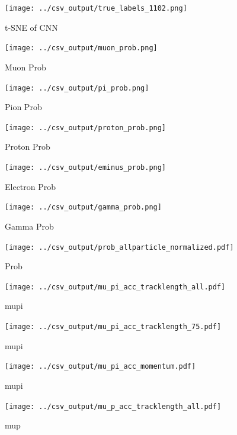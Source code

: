 \begin{figure}[htp]
\centering
\texttt{[image: ../csv\_output/true\_labels\_1102.png]}
\caption{t-SNE of CNN}
\label{fig:tsne}
\end{figure}

\begin{figure}[htp]
\centering
\texttt{[image: ../csv\_output/muon\_prob.png]}
\caption{Muon Prob}
\label{fig:muonprob}
\end{figure}

\begin{figure}[htp]
\centering
\texttt{[image: ../csv\_output/pi\_prob.png]}
\caption{Pion Prob}
\label{fig:piprob}
\end{figure}

\begin{figure}[htp]
\centering
\texttt{[image: ../csv\_output/proton\_prob.png]}
\caption{Proton Prob}
\label{fig:protonprob}
\end{figure}

\begin{figure}[htp]
\centering
\texttt{[image: ../csv\_output/eminus\_prob.png]}
\caption{Electron Prob}
\label{fig:eminusprob}
\end{figure}

\begin{figure}[htp]
\centering
\texttt{[image: ../csv\_output/gamma\_prob.png]}
\caption{Gamma Prob}
\label{fig:gammaprob}
\end{figure}

\begin{figure}[htp]
\centering
\texttt{[image: ../csv\_output/prob\_allparticle\_normalized.pdf]}
\caption{Prob}
\label{fig:prob}
\end{figure}

\begin{figure}[htp]
\centering
\texttt{[image: ../csv\_output/mu\_pi\_acc\_tracklength\_all.pdf]}
\caption{mupi}
\label{fig:mu_pi}
\end{figure}

\begin{figure}[htp]
\centering
\texttt{[image: ../csv\_output/mu\_pi\_acc\_tracklength\_75.pdf]}
\caption{mupi}
\label{fig:mu_pi}
\end{figure}

\begin{figure}[htp]
\centering
\texttt{[image: ../csv\_output/mu\_pi\_acc\_momentum.pdf]}
\caption{mupi}
\label{fig:mu_pi}
\end{figure}

\begin{figure}[htp]
\centering
\texttt{[image: ../csv\_output/mu\_p\_acc\_tracklength\_all.pdf]}
\caption{mup}
\label{fig:mu_p}
\end{figure}

